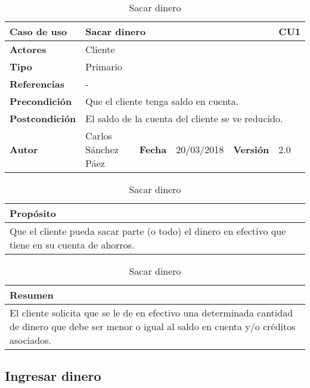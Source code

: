 \documentclass[12pt,spanish]{article}
\begin{document}
\begin{table}[H]
\centering
\begin{tabular}{|m{3cm}|m{4cm}|m{2cm}|m{2cm}|m{2cm}|m{1cm}|}
\hline
\textbf{Caso de uso} &  \multicolumn{4}{m{8cm}|}{Sacar dinero} \vline &  \cellcolor{gray!40}CU1 \\
\hline
\textbf{Actores} & \multicolumn{5}{m{8cm}|}{Cliente} \\
\hline
\textbf{Tipo} & \multicolumn{5}{m{8cm}|}{Primario} \\
\hline
\textbf{Referencias} &\multicolumn{5}{m{8cm}|}{-} \\
\hline
\textbf{Precondición} & \multicolumn{5}{m{8cm}|}{Que el cliente tenga saldo en cuenta.} \\
\hline
\textbf{Postcondición} & \multicolumn{5}{m{8cm}|}{El saldo de la cuenta del cliente se ve reducido.} \\
\hline
\textbf{Autor} & Carlos Sánchez Páez & \textbf{Fecha} & 20/03/2018 & \textbf{Versión} & 2.0 \\
\hline
\end{tabular}

\vspace{1cm}

\begin{tabular}{|m{16.2cm}|}
\hline
\textbf{Propósito} \\
\hline
Que el cliente pueda sacar parte (o todo) el dinero en efectivo que tiene en su cuenta de ahorros. \\
\hline
\end{tabular}

\vspace{1cm}

\begin{tabular}{|m{16.2cm}|}
\hline
\textbf{Resumen} \\
\hline
El cliente solicita que se le de en efectivo una determinada cantidad de dinero que debe ser menor o igual al saldo en cuenta y/o créditos asociados. \\
\hline
\end{tabular}

\caption{Sacar dinero}

\end{table}

\subsection{Ingresar dinero} 
\end{document}
